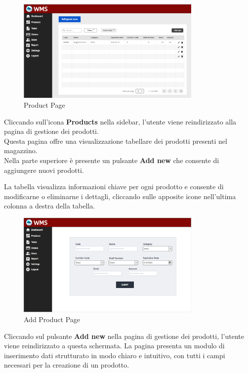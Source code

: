\begin{figure}[H]
    \centering
    \includegraphics[width=0.8\textwidth]{document/sections/img/productPage.png}
    \caption{Product Page}
    \label{fig:productPage}
\end{figure}

Cliccando sull'icona \textbf{Products} nella sidebar, l'utente viene reindirizzato alla pagina di gestione dei prodotti.\\
Questa pagina offre una visualizzazione tabellare dei prodotti presenti nel magazzino.\\
Nella parte superiore è presente un pulsante \textbf{Add new} che consente di aggiungere nuovi prodotti.

La tabella visualizza informazioni chiave per ogni prodotto e consente di modificarne o eliminarne i dettagli,
cliccando sulle apposite icone nell'ultima colonna a destra della tabella.\\

\begin{figure}[H]
    \centering
    \includegraphics[width=0.8\textwidth]{document/sections/img/AddProduct.png}
    \caption{Add Product Page}
    \label{fig:addProductPage}
\end{figure}
Cliccando sul pulsante \textbf{Add new} nella pagina di gestione dei prodotti,
l'utente viene reindirizzato a questa schermata.
La pagina presenta un modulo di inserimento dati strutturato in modo chiaro e intuitivo,
con tutti i campi necessari per la creazione di un prodotto.


